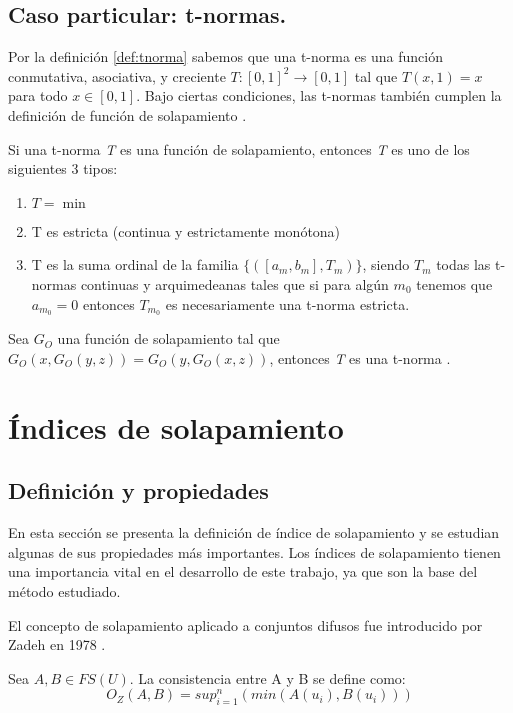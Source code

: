 \subsection{Caso particular: t-normas.}
Por la definición \ref{def:tnorma} sabemos que una t-norma es una función conmutativa, asociativa, y creciente $T:[0,1]^2 \rightarrow [0,1]$ tal que $T(x,1) = x$ para todo $x \in [0,1]$. Bajo ciertas condiciones, las t-normas también cumplen la definición de función de solapamiento \cite{bustince2009overlap}. 
\begin{theorem}
Si una t-norma \emph{T} es una función de solapamiento, entonces \emph{T} es uno de los siguientes 3 tipos:
\begin{enumerate}[label=(\arabic*),ref=(\arabic*)]
	\item $T = \min$
	\item T es estricta (continua y estrictamente monótona)
	\item T es la suma ordinal de la familia $\{([a_{m},b_{m}],T_{m})\}$, siendo $T_{m}$ todas las t-normas continuas y arquimedeanas tales que si para algún $m_{0}$ tenemos que $a_{m_{0}} = 0$ entonces $T_{m_{0}}$ es necesariamente una t-norma estricta.
\end{enumerate}
\end{theorem}
\begin{proposition}
Sea $G_{O}$ una función de solapamiento tal que $G_{O}(x,G_{O}(y,z)) = G_{O}(y,G_{O}(x,z))$, entonces \emph{T} es una t-norma \cite{bustince2013overlap}.
\end{proposition}
\section{Índices de solapamiento}
\subsection{Definición y propiedades}
En esta sección se presenta la definición de índice de solapamiento y se estudian algunas de sus propiedades más importantes. Los índices de solapamiento tienen una importancia vital en el desarrollo de este trabajo, ya que son la base del método estudiado. 

El concepto de solapamiento aplicado a conjuntos difusos fue introducido por Zadeh en 1978 \cite{zadeh1978}.

\begin{definition}
Sea $A,B \in FS(U)$. La consistencia entre A y B se define como:
\begin{equation}\label{eq:zadeh-consistency}
O_{Z}(A,B) = sup_{i=1}^{n}(min(A(u_{i}),B(u_{i})))
\end{equation}
\end{definition}

